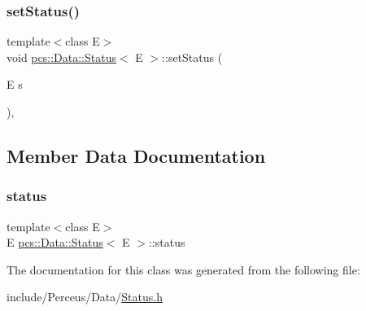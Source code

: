 \mbox{\label{classpcs_1_1Data_1_1Status_acdcaf04de3ed0630d1e930d1ef43178d}} 
\subsubsection{\texorpdfstring{set\+Status()}{setStatus()}}
{\footnotesize\ttfamily template$<$class E$>$ \\
void \hyperlink{classpcs_1_1Data_1_1Status}{pcs\+::\+Data\+::\+Status}$<$ E $>$\+::set\+Status (\begin{DoxyParamCaption}\item[{E}]{s }\end{DoxyParamCaption})\hspace{0.3cm}{\ttfamily [inline]}, {\ttfamily [protected]}}



\subsection{Member Data Documentation}
\mbox{\label{classpcs_1_1Data_1_1Status_ac7e82c907984d7ad0e871e21d3631ab0}} 
\subsubsection{\texorpdfstring{status}{status}}
{\footnotesize\ttfamily template$<$class E$>$ \\
E \hyperlink{classpcs_1_1Data_1_1Status}{pcs\+::\+Data\+::\+Status}$<$ E $>$\+::status\hspace{0.3cm}{\ttfamily [private]}}



The documentation for this class was generated from the following file\+:\begin{DoxyCompactItemize}
\item 
include/\+Perceus/\+Data/\hyperlink{Status_8h}{Status.\+h}\end{DoxyCompactItemize}
